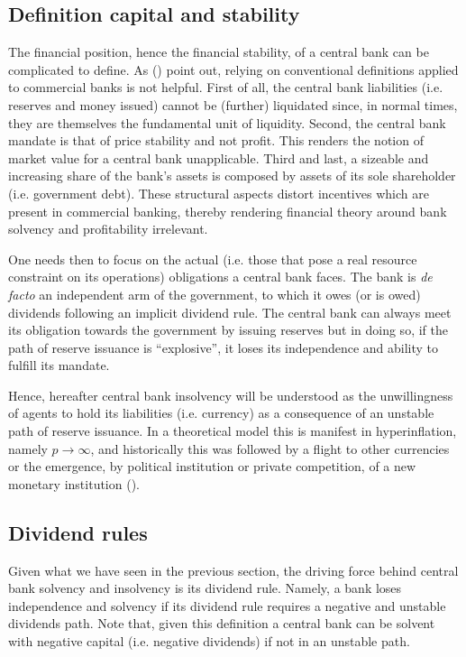\documentclass[american]{scrartcl}
\newcommand{\citein}[1]{\citeauthor{#1} (\citeyear{#1})}
\begin{document}
\subsection{Definition capital and stability}

The financial position, hence the financial stability, of a central bank can be complicated to define. As \citein{Hall2015} point out, relying on conventional definitions applied to commercial banks is not helpful. First of all, the central bank liabilities (i.e. reserves and money issued) cannot be (further) liquidated since, in normal times, they are themselves the fundamental unit of liquidity. Second, the central bank mandate is that of price stability and not profit. This renders the notion of market value for a central bank unapplicable. Third and last, a sizeable and increasing share of the bank's assets is composed by assets of its sole shareholder (i.e. government debt). These structural aspects distort incentives which are present in commercial banking, thereby rendering financial theory around bank solvency and profitability irrelevant.

One needs then to focus on the actual (i.e. those that pose a real resource constraint on its operations) obligations a central bank faces. The bank is \textit{de facto} an independent arm of the government, to which it owes (or is owed) dividends following an implicit dividend rule. The central bank can always meet its obligation towards the government by issuing reserves but in doing so, if the path of reserve issuance is ``explosive'', it loses its independence and ability to fulfill its mandate. %

Hence, hereafter central bank insolvency will be understood as the unwillingness of agents to hold its liabilities (i.e. currency) as a consequence of an unstable path of reserve issuance. In a theoretical model this is manifest in hyperinflation, namely $p \xrightarrow{} \infty$, and historically this was followed by a flight to other currencies or the emergence, by political institution or private competition, of a new monetary institution (\cite{Flandreau2007}). %

\subsection{Dividend rules}

Given what we have seen in the previous section, the driving force behind central bank solvency and insolvency is its dividend rule. Namely, a bank loses independence and solvency if its dividend rule requires a negative and unstable dividends path. Note that, given this definition a central bank can be solvent with negative capital (i.e. negative dividends) if not in an unstable path.
\end{document}
